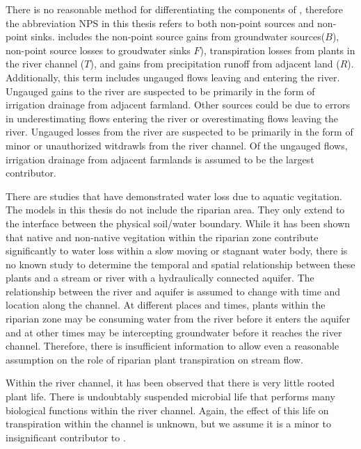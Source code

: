 \begin{linenumbers}
There is no reasonable method for differentiating the components of \Qnps, therefore the abbreviation NPS in this thesis refers to both non-point sources and non-point sinks.   \Qnps includes the non-point source gains from groundwater sources($ B $), non-point source losses to groudwater sinks {}$ F $), transpiration losses from plants in the river channel ($ T $), and gains from precipitation runoff from adjacent land ($ R $).  Additionally, this term includes ungauged flows leaving and entering the river.  Ungauged gains to the river are suspected to be primarily in the form of irrigation drainage from adjacent farmland.  Other sources could be due to errors in underestimating flows entering the river or overestimating flows leaving the river.  Ungauged losses from the river are suspected to be primarily in the form of minor or unauthorized witdrawls from the river channel.  Of the ungauged flows, irrigation drainage from adjacent farmlands is assumed to be the largest contributor.

There are studies that have demonstrated water loss due to aquatic vegitation.  The models in this thesis do not include the riparian area.  They only extend to the interface between the physical soil/water boundary.  While it has been shown that native and non-native vegitation within the riparian zone contribute significantly to water loss within a slow moving or stagnant water body, there is no known study to determine the temporal and spatial relationship between these plants and a stream or river with a hydraulically connected aquifer.  The relationship between the river and aquifer is assumed to change with time and location along the channel.  At different places and times, plants within the riparian zone may be consuming water from the river before it enters the aquifer and at other times may be intercepting groundwater before it reaches the river channel.  Therefore, there is insufficient information to allow even a reasonable assumption on the role of riparian plant transpiration on stream flow.

Within the river channel, it has been observed that there is very little rooted plant life.  There is undoubtably suspended microbial life that performs many biological functions within the river channel.  Again, the effect of this life on transpiration within the channel is unknown, but we assume it is a minor to insignificant contributor to \Qnps.


\end{linenumbers}
